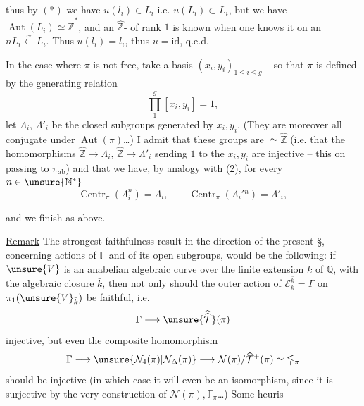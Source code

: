 
thus by $(*)$ we have $u(l_i)\in L_i$ i.e. $u(L_i)\subset L_i$,
but we have $\operatorname{Aut}(L_i)\simeq\widehat{\mathbb Z}^{*}$, and an
  
$\widehat{\mathbb Z}$-  of rank $1$
 is known when one knows it
on an $nL_i\xleftarrow{\sim}L_i$.
Thus  $u(l_i)=l_i$,
thus $u=\mathrm{id}$, q.e.d.

In the case where $\pi$ is not free,
take a  basis $(x_i,y_i)_{1\leq i\leq g}$
-- so that $\pi$ is defined by the generating relation
\[
\tag{3} \prod_1^g[x_i,y_i]=1,
\]
let $\Lambda_i$, $\Lambda'_i$ be the closed subgroups
generated by $x_i,y_i$.
 (They are moreover all conjugate under
$\operatorname{Aut}(\pi)$\ldots) I admit that these groups
are $\simeq\widehat{\mathbb Z}$ (i.e. that the
 homomorphisms $\widehat{\mathbb Z}\longrightarrow\Lambda_i$,
$\widehat{\mathbb Z}\longrightarrow\Lambda'_i$ sending $1$ to the
$x_i,y_i$ are injective -- this 
 on passing to $\pi_{\mathrm{ab}}$)
\uline{and} that we have, by analogy with (2), for
every $n\in\unsure{\mathbb N^{*}}$
\[
\tag{4}
\operatorname{Centr}_{\pi}(\Lambda_i^n)=\Lambda_i,\qquad
\operatorname{Centr}_{\pi}(\Lambda_i'{}^n)=\Lambda'_i,
\]


and we finish as above.

\uline{Remark} The strongest faithfulness
result in the direction of the present
\S, concerning actions of $\mathbb{\Gamma}$ and of
its open subgroups, would be the
following: if $\unsure{V}$ is an
anabelian algebraic curve over the finite
extension $k$ of $\mathbb Q$, with the algebraic closure $\bar k$,
then not only should the outer action
of $\mathcal E_k^{\bar k}=\Gamma$ on
$\pi_1(\unsure{V}_{\bar k})$ be
faithful, i.e.
\[
\Gamma\longrightarrow\unsure{\widehat{\widehat{\mathcal T}}}(\pi)
\]
injective, but even the composite
homomorphism
\[
\Gamma\longrightarrow
\unsure{\mathcal N_4(\pi)|\mathcal N_{\Delta}(\pi)}
\longrightarrow\mathcal N(\pi)/\widehat{\mathcal T}^{+}(\pi)
\simeq\mathbb{\Gamma}_{\pi}
\]
should be injective (in which case it will
even be an isomorphism, since it is
surjective by the very construction of
$\mathcal N(\pi),\mathbb{\Gamma}_{\pi}$\ldots)
Some heuris-

